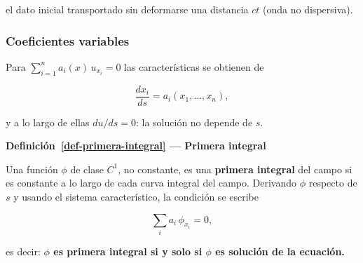 \documentclass[
  spanish,
  a4paper,
]{scrbook}
\theoremstyle{definition}
\theoremstyle{plain}
\theoremstyle{definition}
\theoremstyle{plain}
\theoremstyle{definition}
\theoremstyle{remark}
\begin{document}
el dato inicial transportado sin deformarse una distancia \(ct\) (onda
no dispersiva).

\subsubsection{Coeficientes variables}\label{coeficientes-variables}

Para \(\displaystyle\sum_{i=1}^{n} a_i(x)\,u_{x_i} = 0\) las
características se obtienen de

\[
\frac{dx_i}{ds} = a_i(x_1,\dots,x_n) ,
\]

y a lo largo de ellas \(du/ds = 0\): la solución no depende de \(s\).

\begin{tcolorbox}[enhanced jigsaw, arc=.35mm, bottomrule=.15mm, breakable, colback=white, colframe=quarto-callout-note-color-frame, left=2mm, leftrule=.75mm, opacityback=0, rightrule=.15mm, toprule=.15mm]
\begin{minipage}[t]{5.5mm}
\textcolor{quarto-callout-note-color}{\faInfo}
\end{minipage}%
\begin{minipage}[t]{\textwidth - 5.5mm}

\vspace{-3mm}\textbf{Definición~\ref{def-primera-integral} --- Primera integral}\vspace{3mm}

Una función \(\phi\) de clase \(C^1\), no constante, es una
\textbf{primera integral} del campo si es constante a lo largo de cada
curva integral del campo. Derivando \(\phi\) respecto de \(s\) y usando
el sistema característico, la condición se escribe

\[
\sum_i a_i\,\phi_{x_i} = 0 ,
\]

es decir: \textbf{\(\phi\) es primera integral si y solo si \(\phi\) es
solución de la ecuación.}

\end{minipage}%
\end{tcolorbox}
\end{document}
